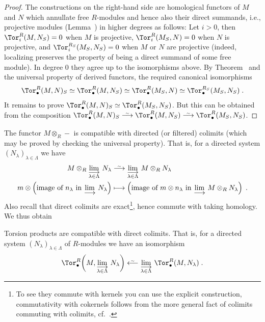 \documentclass[a4paper,parskip=half,numbers=enddot, DIV=12]{scrreprt}
\begin{document}
\begin{proof}
	The constructions on the right-hand side are homological functors of $M$ and $N$ which annullate free $R$-modules and hence also their direct summands, i.e., projective modules (Lemma~) in higher degrees as follows: Let $i>0$, then $\Tor_i^R(M,N_S)=0$ when $M$ is projective, $\Tor_i^R(M_S,N)=0$ when $N$ is projective, and $\Tor_i^{R_S}(M_S,N_S)=0$ when $M$ or $N$ are projective (indeed, localizing preserves the property of being a direct summand of some free module). In degree $0$ they agree up to the isomorphisms above. By Theorem~ and the universal property of derived functors, the required canonical isomorphisms
	\begin{align*}
		\Tor_\bullet^R(M,N)_S\simeq \Tor_\bullet^R(M,N_S)\simeq \Tor_\bullet^R(M_S,N) \simeq \Tor_\bullet^{R_S}(M_S,N_S)\;.
	\end{align*}
	It remains to prove $\Tor_\bullet^R(M,N)_S\simeq \Tor_\bullet^R(M_S,N_S)$. But this can be obtained from the composition $\Tor_\bullet^R(M,N)_S\isomorphism \Tor_\bullet^R(M,N_S)\isomorphism \Tor_\bullet^R(M_S,N_S)$.
\end{proof}
The functor $M\otimes_R-$ is compatible with directed (or filtered) colimits (which may be proved by checking the universal property). That is, for a directed system $(N_\lambda)_{\lambda\in\Lambda}$ we have
\begin{align*}
	M\otimes_R\colimit[\lambda\in\Lambda]N_\lambda&\isomorphism \colimit[\lambda\in\Lambda]M\otimes_RN_\lambda\\
	m\otimes\left(\text{image of }n_\lambda\text{ in }\colimit N_\lambda\right)&\longmapsto \left(\text{image of }m\otimes n_\lambda\text{ in }\colimit M\otimes_RN_\lambda\right)\;.
\end{align*}
Also recall that direct colimits are exact\footnote{To see they commute with kernels you can use the explicit construction, commutativity with cokernels follows from the more general fact of colimits commuting with colimits, cf.\ \cite[Lemma~A.1.4]{alggeo2}.}, hence commute with taking homology. We thus obtain
\begin{fact}
	Torsion products are compatible with direct colimits. That is, for a directed system $(N_\lambda)_{\lambda\in\Lambda}$ of $R$-modules we have an isomorphism
	\begin{align*}
		\Tor_\bullet^R\bigg(M,\colimit[\lambda\in\Lambda]N_\lambda\bigg)\lisomorphism \colimit[\lambda\in\Lambda]\Tor_\bullet^R(M,N_\lambda)\;.
	\end{align*}
\end{fact}
\end{document}
